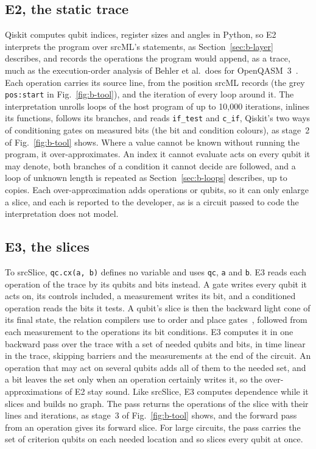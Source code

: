 \subsection{E2, the static trace}
Qiskit computes qubit indices, register sizes and angles in Python, so E2 interprets the program over srcML's statements, as
Section~\ref{sec:b-layer} describes, and records the operations the program would append, as a trace, much as the execution-order
analysis of Behler et al.\ does for OpenQASM~3~\cite{behler2025static}. Each operation carries its source line, from
the position srcML records (the grey \texttt{pos:start} in Fig.~\ref{fig:b-tool}), and the iteration of every loop around it. The
interpretation unrolls loops of the host program of up to 10{,}000 iterations, inlines its functions, follows its
branches, and reads \texttt{if\_test} and \texttt{c\_if}, Qiskit's two ways of conditioning gates on measured bits
(the bit and condition colours), as stage~2 of Fig.~\ref{fig:b-tool} shows. Where a value cannot be known without running the program,
it over-approximates. An index it cannot evaluate acts on every qubit it may denote, both branches of a condition it
cannot decide are followed, and a loop of unknown length is repeated as Section~\ref{sec:b-loops} describes, up to
\numToolMaxCopies{} copies. Each over-approximation adds operations or qubits, so it can only enlarge a slice, and each
is reported to the developer, as is a circuit passed to code the interpretation does not model.

\subsection{E3, the slices}
To srcSlice, \texttt{qc.cx(a, b)} defines no variable and uses \texttt{qc}, \texttt{a} and \texttt{b}. E3 reads each
operation of the trace by its qubits and bits instead. A gate writes every qubit it acts on, its controls included, a
measurement writes its bit, and a conditioned operation reads the bits it tests. A qubit's slice is then the backward
light cone of its final state, the relation compilers use to order and place gates~\cite{murali2019triq, amy2020staq},
followed from each measurement to the operations its bit conditions. E3 computes it in one backward pass over the
trace with a set of needed qubits and bits, in time linear in the trace, skipping barriers and the measurements at the
end of the circuit. An operation that may act on several qubits adds all of them to the needed set, and a bit leaves
the set only when an operation certainly writes it, so the over-approximations of E2 stay sound. Like srcSlice, E3
computes dependence while it slices and builds no graph. The pass returns the operations of the slice with their lines
and iterations, as stage~3 of Fig.~\ref{fig:b-tool} shows, and the forward pass from an operation gives its forward
slice. For large circuits, the pass carries the set of criterion qubits on each needed location and so slices every
qubit at once.

